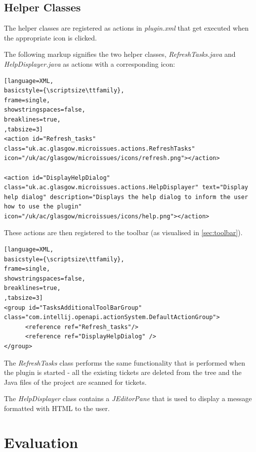 \documentclass{4thYearProject}
\begin{document}
\section{Helper Classes}

The helper classes are registered as actions in \textit{plugin.xml} that get executed when the appropriate icon is clicked.

The following markup signifies the two helper classes, \textit{RefreshTasks.java} and \textit{HelpDisplayer.java} as actions with a corresponding icon:

\begin{lstlisting}[language=XML, 
basicstyle={\scriptsize\ttfamily}, 
frame=single,
showstringspaces=false,
breaklines=true,
,tabsize=3]
<action id="Refresh_tasks" class="uk.ac.glasgow.microissues.actions.RefreshTasks" icon="/uk/ac/glasgow/microissues/icons/refresh.png"></action>

<action id="DisplayHelpDialog" class="uk.ac.glasgow.microissues.actions.HelpDisplayer" text="Display help dialog" description="Displays the help dialog to inform the user how to use the plugin" icon="/uk/ac/glasgow/microissues/icons/help.png"></action>

\end{lstlisting}

These actions are then registered to the toolbar (as visualised in \ref{sec:toolbar}). %

\begin{lstlisting}[language=XML, 
basicstyle={\scriptsize\ttfamily}, 
frame=single,
showstringspaces=false,
breaklines=true,
,tabsize=3]
<group id="TasksAdditionalToolBarGroup" class="com.intellij.openapi.actionSystem.DefaultActionGroup">
      <reference ref="Refresh_tasks"/>
      <reference ref="DisplayHelpDialog" />
</group>

\end{lstlisting}


The \textit{RefreshTasks} class performs the same functionality that is performed when the plugin is started - all the existing tickets are deleted from the tree and the Java files of the project are scanned for tickets. 

The \textit{HelpDisplayer} class contains a \textit{JEditorPane} that is used to display a message formatted with HTML to the user.

\chapter{Evaluation}
\end{document}
